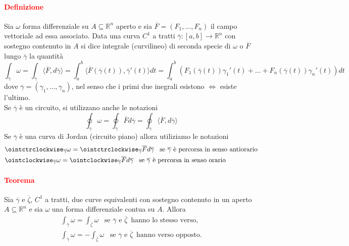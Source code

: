 \documentclass{article}
\newcommand{\R}{\mathbb{R}}
\begin{document}
\paragraph{\textcolor{red}{Definizione}}
Sia $\omega$ forma differenziale su $A \subseteq \R^n$ aperto e sia $\overline{F}=(F_1,...,F_n)$ il campo vettoriale ad essa associato. Data una curva $C^1$ a tratti $\overline{\gamma} :[a,b]\rightarrow \R^n$ con sostegno contenuto in $A$ si dice integrale (curvilineo) di seconda specie di $\omega$ o $\overline{F}$ lungo $\overline{\gamma}$ la quantità
\begin{equation*}
    \int_{\overline{\gamma}}\omega = \int_{\overline{\gamma}}\langle \overline{F},d\overline{\gamma} \rangle = \int_a^b \langle \overline{F}(\overline{\gamma}(t)),\overline{\gamma}'(t) \rangle dt=\int_a^b (F_1 (\overline{\gamma}(t))\gamma_1'(t)+...+F_n(\overline{\gamma}(t))\gamma_n'(t))dt
\end{equation*}
 dove $\overline{\gamma}=(\gamma_1,...,\gamma_n)$, nel senso che i primi due inegrali esistono $\Leftrightarrow $ esiste l'ultimo.\\
  Se $\overline{\gamma} $ è un circuito, si utilizzano anche le notazioni
  \begin{equation*}
      \oint_{\overline{\gamma}} \omega= \oint_{\overline{\gamma}} \overline{F} d\overline{\gamma} = \oint_{\overline{\gamma}}\langle \overline{F},d\overline{\gamma} \rangle
  \end{equation*}
  Se $\overline{\gamma}$ è una curva di Jordan (circuito piano) allora utiliziamo le notazioni
  \begin{align*}
      &\ointctrclockwise_{\overline{\gamma}} \omega=\ointctrclockwise_{\overline{\gamma}}\overline{F}d\overline{\gamma}\,\,\,\,\, \text{se} \,\, \overline{\gamma}\,\, \text{è percorsa in senso antiorario} \\
      &\ointclockwise_{\overline{\gamma}}\omega=\ointclockwise_{\overline{\gamma}}\overline{F}d\overline{\gamma} \,\,\,\,\, \text{se} \,\, \overline{\gamma}\,\, \text{è percorsa in senso orario}
  \end{align*}
  
\paragraph{\textcolor{red}{Teorema}}
Sia $\overline{\gamma}$ e $\overline{\zeta}$, $C^1$ a tratti, due curve equivalenti  con sostegno contenuto in un aperto $A \subseteq \R^n$ e sia $\omega$ una forma differenziale contua su $A$. Allora
\begin{align*}
    \int_{\overline{\gamma}} \omega= \int_{\overline{\zeta}} \omega
    \,\,\,\,\,\text{se}\,\, \overline{\gamma}\,\, \text{e}\,\,\overline{\zeta}\,\,\, \text{hanno lo stesso verso,}\\
    \int_{\overline{\gamma}}\omega= -\int_{\overline{\zeta}} \omega 
    \,\,\,\,\,\text{se} \,\,\overline{\gamma} \,\, \text{e}\,\,\overline{\zeta} \,\,\,\text{hanno verso opposto.}
\end{align*}
\end{document}
